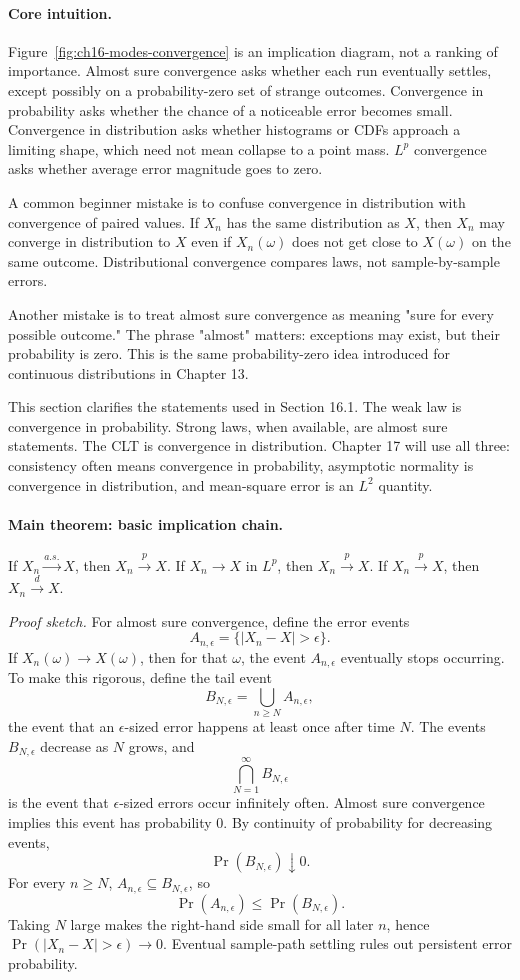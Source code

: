 \paragraph{Core intuition.}
Figure~\ref{fig:ch16-modes-convergence} is an implication diagram, not a ranking of importance. Almost sure convergence asks whether each run eventually settles, except possibly on a probability-zero set of strange outcomes. Convergence in probability asks whether the chance of a noticeable error becomes small. Convergence in distribution asks whether histograms or CDFs approach a limiting shape, which need not mean collapse to a point mass. \(L^p\) convergence asks whether average error magnitude goes to zero.

A common beginner mistake is to confuse convergence in distribution with convergence of paired values. If \(X_n\) has the same distribution as \(X\), then \(X_n\) may converge in distribution to \(X\) even if \(X_n(\omega)\) does not get close to \(X(\omega)\) on the same outcome. Distributional convergence compares laws, not sample-by-sample errors.

Another mistake is to treat almost sure convergence as meaning "sure for every possible outcome." The phrase "almost" matters: exceptions may exist, but their probability is zero. This is the same probability-zero idea introduced for continuous distributions in Chapter 13.

This section clarifies the statements used in Section 16.1. The weak law is convergence in probability. Strong laws, when available, are almost sure statements. The CLT is convergence in distribution. Chapter 17 will use all three: consistency often means convergence in probability, asymptotic normality is convergence in distribution, and mean-square error is an \(L^2\) quantity.

\paragraph{Main theorem: basic implication chain.}
If \(X_n\xrightarrow{a.s.}X\), then \(X_n\xrightarrow{p}X\). If \(X_n\to X\) in \(L^p\), then \(X_n\xrightarrow{p}X\). If \(X_n\xrightarrow{p}X\), then \(X_n\xrightarrow{d}X\).

\emph{Proof sketch.}
For almost sure convergence, define the error events
\[
A_{n,\epsilon}=\{|X_n-X|>\epsilon\}.
\]
If \(X_n(\omega)\to X(\omega)\), then for that \(\omega\), the event \(A_{n,\epsilon}\) eventually stops occurring. To make this rigorous, define the tail event
\[
B_{N,\epsilon}=\bigcup_{n\geq N}A_{n,\epsilon},
\]
the event that an \(\epsilon\)-sized error happens at least once after time \(N\). The events \(B_{N,\epsilon}\) decrease as \(N\) grows, and
\[
\bigcap_{N=1}^{\infty}B_{N,\epsilon}
\]
is the event that \(\epsilon\)-sized errors occur infinitely often. Almost sure convergence implies this event has probability \(0\). By continuity of probability for decreasing events,
\[
\Pr(B_{N,\epsilon})\downarrow0.
\]
For every \(n\geq N\), \(A_{n,\epsilon}\subseteq B_{N,\epsilon}\), so
\[
\Pr(A_{n,\epsilon})\leq \Pr(B_{N,\epsilon}).
\]
Taking \(N\) large makes the right-hand side small for all later \(n\), hence \(\Pr(|X_n-X|>\epsilon)\to0\). Eventual sample-path settling rules out persistent error probability.

